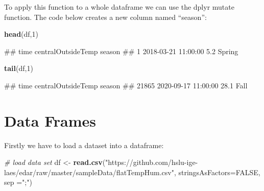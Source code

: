 \documentclass[
]{book}
\newenvironment{Shaded}{\begin{snugshade}}{\end{snugshade}}
\newcommand{\CommentTok}[1]{\textcolor[rgb]{0.56,0.35,0.01}{\textit{#1}}}
\newcommand{\DataTypeTok}[1]{\textcolor[rgb]{0.13,0.29,0.53}{#1}}
\newcommand{\DecValTok}[1]{\textcolor[rgb]{0.00,0.00,0.81}{#1}}
\newcommand{\KeywordTok}[1]{\textcolor[rgb]{0.13,0.29,0.53}{\textbf{#1}}}
\newcommand{\NormalTok}[1]{#1}
\newcommand{\OperatorTok}[1]{\textcolor[rgb]{0.81,0.36,0.00}{\textbf{#1}}}
\newcommand{\OtherTok}[1]{\textcolor[rgb]{0.56,0.35,0.01}{#1}}
\newcommand{\StringTok}[1]{\textcolor[rgb]{0.31,0.60,0.02}{#1}}
\let\oldShaded\Shaded
\let\endoldShaded\endShaded
\renewenvironment{Shaded}{\footnotesize\oldShaded}{\endoldShaded}
\let\oldverbatim\verbatim
\let\endoldverbatim\endverbatim
\renewenvironment{verbatim}{\footnotesize\oldverbatim}{\endoldverbatim}
\begin{document}
To apply this function to a whole dataframe we can use the dplyr mutate function. The code below creates a new column named ``season'':

\begin{Shaded}
\end{Shaded}

\begin{Shaded}
\begin{Highlighting}[]
\KeywordTok{head}\NormalTok{(df,}\DecValTok{1}\NormalTok{)}
\end{Highlighting}
\end{Shaded}

\begin{verbatim}
##                  time centralOutsideTemp season
## 1 2018-03-21 11:00:00                5.2 Spring
\end{verbatim}

\begin{Shaded}
\begin{Highlighting}[]
\KeywordTok{tail}\NormalTok{(df,}\DecValTok{1}\NormalTok{)}
\end{Highlighting}
\end{Shaded}

\begin{verbatim}
##                      time centralOutsideTemp season
## 21865 2020-09-17 11:00:00               28.1   Fall
\end{verbatim}

\hypertarget{data-frames}{%
\section{Data Frames}\label{data-frames}}

Firstly we have to load a dataset into a dataframe:

\begin{Shaded}
\begin{Highlighting}[]
\CommentTok{# load data set}
\NormalTok{df <-}\StringTok{ }\KeywordTok{read.csv}\NormalTok{(}\StringTok{"https://github.com/hslu-ige-laes/edar/raw/master/sampleData/flatTempHum.csv"}\NormalTok{,}
               \DataTypeTok{stringsAsFactors=}\OtherTok{FALSE}\NormalTok{,}
               \DataTypeTok{sep =}\StringTok{";"}\NormalTok{)}
\end{Highlighting}
\end{Shaded}
\end{document}
